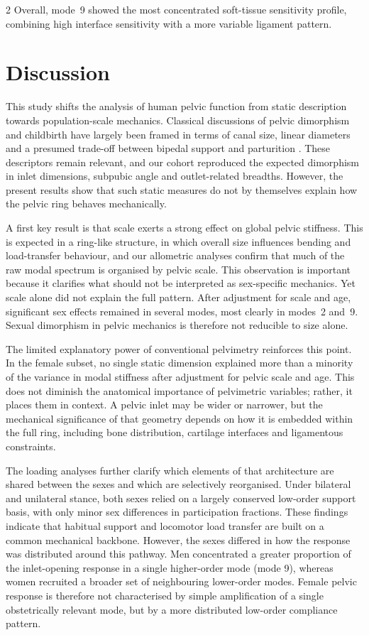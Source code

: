 \documentclass[openacc]{rsproca_new}
\begin{document}
\begin{multicols}{2}
Overall, mode~9 showed the most concentrated soft-tissue sensitivity profile, combining high interface sensitivity with a more variable ligament pattern.

\section{Discussion}

This study shifts the analysis of human pelvic function from static description towards population-scale mechanics. Classical discussions of pelvic dimorphism and childbirth have largely been framed in terms of canal size, linear diameters and a presumed trade-off between bipedal support and parturition \cite{RosenbergTrevathan2002,Trevathan2015,Grunstra2023}. These descriptors remain relevant, and our cohort reproduced the expected dimorphism in inlet dimensions, subpubic angle and outlet-related breadths. However, the present results show that such static measures do not by themselves explain how the pelvic ring behaves mechanically.

A first key result is that scale exerts a strong effect on global pelvic stiffness. This is expected in a ring-like structure, in which overall size influences bending and load-transfer behaviour, and our allometric analyses confirm that much of the raw modal spectrum is organised by pelvic scale. This observation is important because it clarifies what should not be interpreted as sex-specific mechanics. Yet scale alone did not explain the full pattern. After adjustment for scale and age, significant sex effects remained in several modes, most clearly in modes~2 and~9. Sexual dimorphism in pelvic mechanics is therefore not reducible to size alone.

The limited explanatory power of conventional pelvimetry reinforces this point. In the female subset, no single static dimension explained more than a minority of the variance in modal stiffness after adjustment for pelvic scale and age. This does not diminish the anatomical importance of pelvimetric variables; rather, it places them in context. A pelvic inlet may be wider or narrower, but the mechanical significance of that geometry depends on how it is embedded within the full ring, including bone distribution, cartilage interfaces and ligamentous constraints.

The loading analyses further clarify which elements of that architecture are shared between the sexes and which are selectively reorganised. Under bilateral and unilateral stance, both sexes relied on a largely conserved low-order support basis, with only minor sex differences in participation fractions. These findings indicate that habitual support and locomotor load transfer are built on a common mechanical backbone. However, the sexes differed in how the response was distributed around this pathway. Men concentrated a greater proportion of the inlet-opening response in a single higher-order mode (mode 9), whereas women recruited a broader set of neighbouring lower-order modes. Female pelvic response is therefore not characterised by simple amplification of a single obstetrically relevant mode, but by a more distributed low-order compliance pattern.


\end{multicols}
\end{document}
